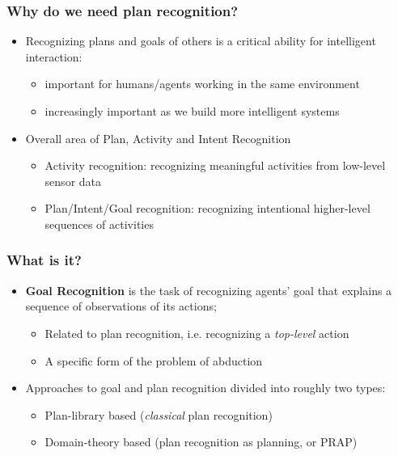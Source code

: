 \documentclass[usenames,dvipsnames]{beamer}
\begin{document}
	\begin{frame}[c]\frametitle{Why do we need plan recognition?}
		\begin{itemize}
			\item Recognizing plans and goals of others is a critical ability for intelligent interaction:
			\begin{itemize}
				\item important for humans/agents working in the same environment
				\item increasingly important as we build more intelligent systems
			\end{itemize}
			\item Overall area of Plan, Activity and Intent Recognition
			\begin{itemize}
				\item Activity recognition: recognizing meaningful activities from low-level sensor data
				\item Plan/Intent/Goal recognition: recognizing intentional higher-level sequences of activities 
			\end{itemize}
		\end{itemize}
	\end{frame}

	\begin{frame}[c]\frametitle{What is it?}
		\begin{itemize}
			\item \textbf{Goal Recognition} is the task of recognizing agents' goal that explains a sequence of observations of its actions;
			\begin{itemize}
				\item Related to plan recognition, i.e. recognizing a \emph{top-level} action
				\item A specific form of the problem of abduction 
			\end{itemize}
			\item Approaches to goal and plan recognition divided into roughly two types:
			\begin{itemize}
				\item Plan-library based (\emph{classical} plan recognition)
				\item Domain-theory based (plan recognition as planning, or PRAP)
			\end{itemize}
		\end{itemize}
	\end{frame}
	
\end{document}
